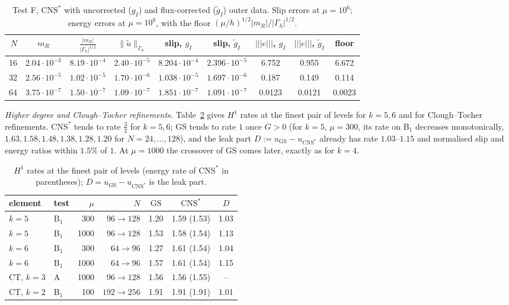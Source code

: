 \documentclass[pdflatex,sn-mathphys-num]{sn-jnl}
\theoremstyle{thmstyleone}
\theoremstyle{thmstylethree}
\newcommand{\Gh}{\Gamma_h}
\newcommand{\gI}{g_I}
\newcommand{\ut}{\tilde u}
\newcommand{\tnorm}[1]{|\!|\!|#1|\!|\!|}
\newcommand{\norm}[1]{\lVert #1\rVert}
\newcommand{\GS}{\mathrm{GS}}
\newcommand{\CNS}{\mathrm{CNS}^\ast}
\begin{document}
\begin{table}[t]
\centering\small
\caption{Test F, $\CNS$ with uncorrected ($\gI$) and flux-corrected ($\tilde g_I$) outer data. Slip errors at $\mu=10^6$; energy errors at $\mu=10^8$, with the floor $(\mu/h)^{1/2}|m_R|/|\Gh|^{1/2}$.}\label{tab:flux}
\setlength{\tabcolsep}{3pt}
\begin{tabular}{rcccccccc}
\toprule
$N$ & $m_R$ & $\frac{|m_R|}{|\Gh|^{1/2}}$ & $\norm{\ut}_{\Gh}$ & slip, $\gI$ & slip, $\tilde g_I$ & $\tnorm e$, $\gI$ & $\tnorm e$, $\tilde g_I$ & floor\\
\midrule
16 & $2.04\cdot10^{-3}$ & $8.19\cdot10^{-4}$ & $2.40\cdot10^{-5}$ & $8.204\cdot10^{-4}$ & $2.396\cdot10^{-5}$ & 6.752 & 0.955 & 6.672\\
32 & $2.56\cdot10^{-5}$ & $1.02\cdot10^{-5}$ & $1.70\cdot10^{-6}$ & $1.038\cdot10^{-5}$ & $1.697\cdot10^{-6}$ & 0.187 & 0.149 & 0.114\\
64 & $3.75\cdot10^{-7}$ & $1.50\cdot10^{-7}$ & $1.09\cdot10^{-7}$ & $1.851\cdot10^{-7}$ & $1.091\cdot10^{-7}$ & 0.0123 & 0.0121 & 0.0023\\
\bottomrule
\end{tabular}
\end{table}

\emph{Higher degree and Clough--Tocher refinements.} Table~\ref{tab:ratesv3} gives $H^1$ rates at the finest pair of levels for $k=5,6$ and for Clough--Tocher refinements. $\CNS$ tends to rate $\frac32$ for $k=5,6$; $\GS$ tends to rate $1$ once $G>0$ (for $k=5$, $\mu=300$, its rate on B$_1$ decreases monotonically, $1.63,1.58,1.48,1.38,1.28,1.20$ for $N=24,\dots,128$), and the leak part $D:=u_{\GS}-u_{\CNS}$ already has rate $1.03$--$1.15$ and normalised slip and energy ratios within $1.5\%$ of $1$. At $\mu=1000$ the crossover of $\GS$ comes later, exactly as for $k=4$.

\begin{table}[t]
\centering\small
\caption{$H^1$ rates at the finest pair of levels (energy rate of $\CNS$ in parentheses); $D=u_{\GS}-u_{\CNS}$ is the leak part.}\label{tab:ratesv3}
\begin{tabular}{llrrccc}
\toprule
element & test & $\mu$ & $N$ & $\GS$ & $\CNS$ & $D$\\
\midrule
$k=5$ & B$_1$ & 300 & $96\to128$ & 1.20 & 1.59 (1.53) & 1.03\\
$k=5$ & B$_1$ & 1000 & $96\to128$ & 1.53 & 1.58 (1.54) & 1.13\\
$k=6$ & B$_1$ & 300 & $64\to96$ & 1.27 & 1.61 (1.54) & 1.04\\
$k=6$ & B$_1$ & 1000 & $64\to96$ & 1.57 & 1.61 (1.54) & 1.15\\
CT, $k=3$ & A & 1000 & $96\to128$ & 1.56 & 1.56 (1.55) & --\\
CT, $k=2$ & B$_1$ & 100 & $192\to256$ & 1.91 & 1.91 (1.91) & 1.01\\
\bottomrule
\end{tabular}
\end{table}
\end{document}
